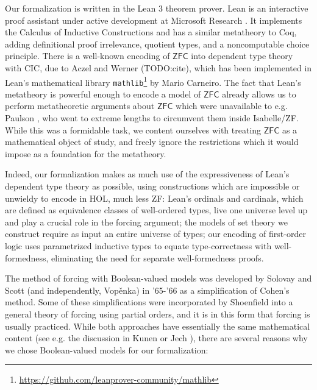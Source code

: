 \documentclass[a4paper,USenglish,cleveref, autoref]{lipics-v2019}
\newcommand{\lil}{\lstinline}
\theoremstyle{definition}
\begin{document}
Our formalization is written in the Lean 3 theorem prover. Lean is an interactive proof assistant under active development at Microsoft Research \cite{de2015lean} \cite{sebastian-slides}. It implements the Calculus of Inductive Constructions and has a similar metatheory to Coq, adding definitional proof irrelevance, quotient types, and a noncomputable choice principle. There is a well-known encoding of $\mathsf{ZFC}$ into dependent type theory with CIC, due to Aczel and Werner (TODO:cite), which has been implemented in Lean's mathematical library \lil{mathlib}\footnote{\url{https://github.com/leanprover-community/mathlib}} by Mario Carneiro. The fact that Lean's metatheory is powerful enough to encode a model of $\mathsf{ZFC}$ already allows us to perform metatheoretic arguments about $\mathsf{ZFC}$ which were unavailable to e.g. Paulson \cite{paulson2003relative}, who went to extreme lengths to circumvent them inside Isabelle/ZF. While this was a formidable task, we content ourselves with treating $\mathsf{ZFC}$ as a mathematical object of study, and freely ignore the restrictions which it would impose as a foundation for the metatheory.

Indeed, our formalization makes as much use of the expressiveness of Lean's dependent type theory as possible, using constructions which are impossible or unwieldy to encode in HOL, much less ZF: Lean's ordinals and cardinals, which are defined as equivalence classes of well-ordered types, live one universe level up and play a crucial role in the forcing argument; the models of set theory we construct require as input an entire universe of types; our encoding of first-order logic uses parametrized inductive types to equate type-correctness with well-formedness, eliminating the need for separate well-formedness proofs.

The method of forcing with Boolean-valued models was developed by Solovay and Scott (and independently, Vop{\v e}nka) in '65-'66 \cite{scott1} \cite{vopenka1} as a simplification of Cohen's method. Some of these simplifications were incorporated by Shoenfield \cite{solovay1} into a general theory of forcing using partial orders, and it is in this form that forcing is usually practiced. While both approaches have essentially the same mathematical content (see e.g. the discussion in Kunen \cite{kunen1} or Jech \cite{jech1}), there are several reasons why we chose Boolean-valued models for our formalization:
\end{document}
